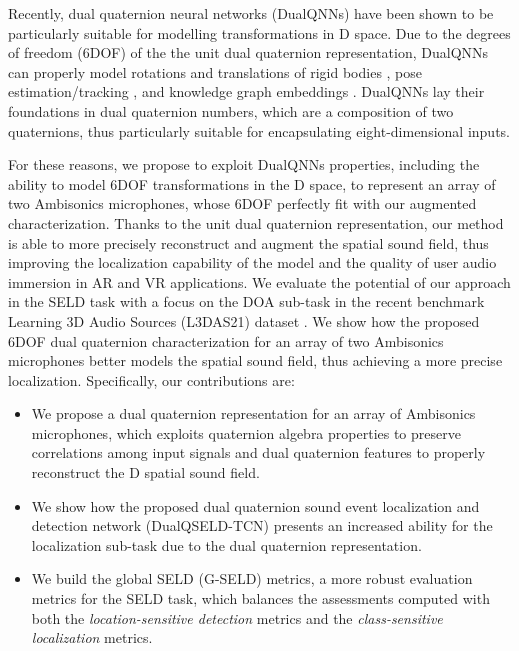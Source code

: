 \documentclass[3p, preprint, twocolumn]{elsarticle}
\begin{document}
Recently, dual quaternion neural networks (DualQNNs) have been shown to be particularly suitable for modelling transformations in D space. Due to the  degrees of freedom (6DOF) of the the unit dual quaternion representation, DualQNNs can properly model rotations and translations of rigid bodies \cite{Poppelbaum2021DQRigid, Schwung2021RigidBody, Schilling2019HierarchicalDQ, TsiotrasDualQuat2020}, pose estimation/tracking \cite{Sveier2021DualQ, Gui2021DualQ}, and knowledge graph embeddings \cite{CaoDual2021, Nguyen2022NodeCB}. DualQNNs lay their foundations in dual quaternion numbers, which are a composition of two quaternions, thus particularly suitable for encapsulating eight-dimensional inputs.

For these reasons, we propose to exploit DualQNNs properties, including the ability to model 6DOF transformations in the D space, to represent an array of two Ambisonics microphones, whose 6DOF \cite{Plinge2018SixDegreesofFreedomBA} perfectly fit with our augmented characterization. Thanks to the unit dual quaternion representation, our method is able to more precisely reconstruct and augment the spatial sound field, thus improving the localization capability of the model and the quality of user audio immersion in AR and VR applications. We evaluate the potential of our approach in the SELD task with a focus on the DOA sub-task in the recent benchmark Learning 3D Audio Sources (L3DAS21) dataset \cite{guizzo2021l3das21}. We show how the proposed 6DOF dual quaternion characterization for an array of two Ambisonics microphones better models the spatial sound field, thus achieving a more precise localization. Specifically, our contributions are:

\begin{itemize}
    \item We propose a dual quaternion representation for an array of Ambisonics microphones, which exploits quaternion algebra properties to preserve correlations among input signals and dual quaternion features to properly reconstruct the D spatial sound field.
    \item We show how the proposed dual quaternion sound event localization and detection network (DualQSELD-TCN) presents an increased ability for the localization sub-task due to the dual quaternion representation.
\item We build the global SELD (G-SELD) metrics, a more robust evaluation metrics for the SELD task, which balances the assessments computed with both the \textit{location-sensitive detection} metrics and the \textit{class-sensitive localization} metrics.  
\end{itemize}
\end{document}
